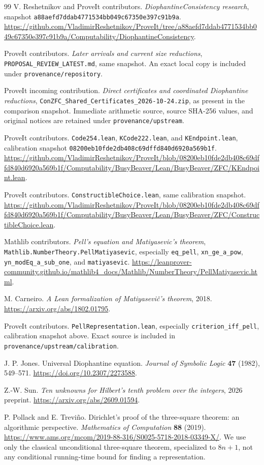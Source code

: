 \documentclass[11pt,letterpaper]{article}
\theoremstyle{definition}\newtheorem{definition}[theorem]{Definition}
\theoremstyle{remark}\newtheorem{remark}[theorem]{Remark}
\newcommand{\file}[1]{\texttt{\nolinkurl{#1}}}
\begin{document}
\begin{thebibliography}{99}
 V. Reshetnikov and ProveIt contributors.
\emph{DiophantineConsistency research}, snapshot
\file{a88aefd7ddab4771534bb049c67350e397c91b9a}.
\url{https://github.com/VladimirReshetnikov/ProveIt/tree/a88aefd7ddab4771534bb049c67350e397c91b9a/Computability/DiophantineConsistency}.

 ProveIt contributors.
\emph{Later arrivals and current size reductions},
\file{PROPOSAL_REVIEW_LATEST.md}, same snapshot. An exact local copy is
included under \file{provenance/repository}.

 ProveIt incoming contribution.
\emph{Direct certificates and coordinated Diophantine reductions},
\file{ConZFC_Shared_Certificates_2026-10-24.zip}, as present in the
comparison snapshot. Immediate arithmetic source, source SHA-256 values,
and original notices are retained under \file{provenance/upstream}.

 ProveIt contributors.
\file{Code254.lean}, \file{KCode222.lean}, and \file{KEndpoint.lean},
calibration snapshot \file{08200eb10fde2db408c69dffd840d6920a569b1f}.
\url{https://github.com/VladimirReshetnikov/ProveIt/blob/08200eb10fde2db408c69dffd840d6920a569b1f/Computability/BusyBeaver/Lean/BusyBeaver/ZFC/KEndpoint.lean}.

 ProveIt contributors.
\file{ConstructibleChoice.lean}, same calibration snapshot.
\url{https://github.com/VladimirReshetnikov/ProveIt/blob/08200eb10fde2db408c69dffd840d6920a569b1f/Computability/BusyBeaver/Lean/BusyBeaver/ZFC/ConstructibleChoice.lean}.

 Mathlib contributors.
\emph{Pell's equation and Matiyasevic's theorem},
\file{Mathlib.NumberTheory.PellMatiyasevic}, especially
\file{eq_pell}, \file{xn_ge_a_pow}, \file{yn_modEq_a_sub_one},
and \file{matiyasevic}.
\url{https://leanprover-community.github.io/mathlib4_docs/Mathlib/NumberTheory/PellMatiyasevic.html}.

 M. Carneiro.
\emph{A Lean formalization of Matiyasevi\v{c}'s theorem}, 2018.
\url{https://arxiv.org/abs/1802.01795}.

 ProveIt contributors.
\file{PellRepresentation.lean}, especially
\file{criterion_iff_pell}, calibration snapshot above. Exact source is
included in \file{provenance/upstream/calibration}.

 J. P. Jones.
Universal Diophantine equation.
\emph{Journal of Symbolic Logic} \textbf{47} (1982), 549--571.
\url{https://doi.org/10.2307/2273588}.

 Z.-W. Sun.
\emph{Ten unknowns for Hilbert's tenth problem over the integers},
2026 preprint.
\url{https://arxiv.org/abs/2609.01594}.

 P. Pollack and E. Trevi\~no.
Dirichlet's proof of the three-square theorem: an algorithmic perspective.
\emph{Mathematics of Computation} \textbf{88} (2019).
\url{https://www.ams.org/mcom/2019-88-316/S0025-5718-2018-03349-X/}.
We use only the classical unconditional three-square theorem, specialized
to $8n+1$, not any conditional running-time bound for finding a representation.
\end{thebibliography}
\end{document}
